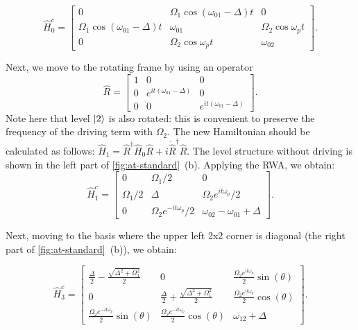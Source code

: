 \documentclass[%
 aip,
 amsmath,amssymb,
 reprint,%
]{revtex4-1}
\begin{document}
\begin{equation*}
\hat H^c_0 = \left[\begin{matrix}
0 & \Omega_{1} \cos{\left(\omega_{01}- \Delta \right)t} & 0\\
\Omega_{1} \cos{\left(\omega_{01} - \Delta \right)t}   & \omega_{01} &\Omega_{2} \cos\omega_p t  \\
0 & \Omega_{2} \cos{\omega_p t}  & \omega_{02}\end{matrix}\right].
\end{equation*}

Next, we move to the rotating frame by using an operator
\[
\hat R = \left[\begin{matrix} 
1 & 0 & 0\\0 & e^{i t \left(\omega_{01}- \Delta\right)} & 0\\0 & 0 & e^{i t \left(\omega_{01}- \Delta\right)}\end{matrix}\right].
\]
Note here that level $\ket{2}$ is also rotated: this is convenient to preserve the frequency of the driving term with $\Omega_2$. The new Hamiltonian should be calculated as follows: $\hat H_1 = \hat R^\dag \hat H_0 \hat R + i \dot{\hat{R}}^\dag \hat R$. The level structure without driving  is shown in the left part of \autoref{fig:at-standard}~(b). Applying the RWA, we obtain:
\begin{equation*}
\hat H^c_1 = \left[\begin{matrix}0 &\Omega_{1}/2 & 0\\\Omega_{1}/2 & \Delta & \Omega_{2} e^{i t \omega_p}/2\\0 & \Omega_{2} e^{-i t \omega_p}/2 & \omega_{02} - \omega_{01}+\Delta \end{matrix}\right].
\end{equation*}

Next, moving to the basis where the upper left 2x2 corner is diagonal (the right part of \autoref{fig:at-standard}~(b)), we obtain:

\begin{equation*}
\hat H^c_3 = \left[\begin{matrix} 
\frac{\Delta}{2} - \frac{\sqrt{\Delta^{2} + \Omega_{1}^{2}}}{2} & 
0 &
\frac{\Omega_{2} e^{i t \omega_{p}}}{2}\sin(\theta)
\\
0 & 
\frac{\Delta}{2} + \frac{\sqrt{\Delta^{2} + \Omega_{1}^{2}}}{2} & 
\frac{\Omega_{2} e^ {i t \omega_p}}{2}\cos(\theta)
\\
\frac{\Omega_{2} e^{-i t \omega_{p}} }{2}\sin(\theta) & 
\frac{\Omega_{2} e^{-i t \omega_{p}}}{2} \cos(\theta) & 
\omega_{12} +\Delta 
\end{matrix}\right].
\end{equation*}
\end{document}
